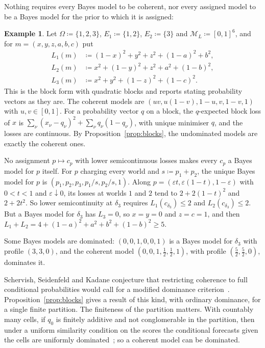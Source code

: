 \documentclass[11pt]{article}
\theoremstyle{definition}
\newtheorem{example}[theorem]{Example}
\theoremstyle{remark}
\newcommand{\M}{\mathcal M}
\begin{document}
Nothing requires every Bayes model to be coherent, nor every assigned model to be a Bayes model for the prior to which it is assigned:
\begin{example}\label{ex:conditional}
Let $\Omega\coloneqq\{1,2,3\}$, $E_1\coloneqq\{1,2\}$, $E_2\coloneqq\{3\}$ and $\M_L\coloneqq[0,1]^6$, and for $m=(x,y,z,a,b,c)$ put
\[
\begin{aligned}
L_1(m)&\coloneqq (1-x)^2+y^2+z^2+(1-a)^2+b^2,\\
L_2(m)&\coloneqq x^2+(1-y)^2+z^2+a^2+(1-b)^2,\\
L_3(m)&\coloneqq x^2+y^2+(1-z)^2+(1-c)^2.
\end{aligned}
\]
This is the block form with quadratic blocks and reports stating probability vectors as they are. The coherent models are $(uv,u(1-v),1-u,v,1-v,1)$ with $u,v\in[0,1]$. For a probability vector $q$ on a block, the $q$-expected block loss of $x$ is $\sum_\nu(x_\nu-q_\nu)^2+\sum_\nu q_\nu(1-q_\nu)$, with unique minimiser $q$, and the losses are continuous. By Proposition~\ref{prop:blocks}, the undominated models are exactly the coherent ones.

No assignment $p\mapsto c_p$ with lower semicontinuous losses makes every $c_p$ a Bayes model for $p$ itself. For $p$ charging every world and $s\coloneqq p_1+p_2$, the unique Bayes model for $p$ is $(p_1,p_2,p_3,p_1/s,p_2/s,1)$. Along $p=(\varepsilon t,\varepsilon(1-t),1-\varepsilon)$ with $0<t<1$ and $\varepsilon\downarrow0$, its losses at worlds $1$ and $2$ tend to $2+2(1-t)^2$ and $2+2t^2$. So lower semicontinuity at $\delta_3$ requires $L_1(c_{\delta_3})\le2$ and $L_2(c_{\delta_3})\le2$. But a Bayes model for $\delta_3$ has $L_3=0$, so $x=y=0$ and $z=c=1$, and then $L_1+L_2=4+(1-a)^2+a^2+b^2+(1-b)^2\ge5$.

Some Bayes models are dominated: $(0,0,1,0,0,1)$ is a Bayes model for $\delta_3$ with profile $(3,3,0)$, and the coherent model $(0,0,1,\frac12,\frac12,1)$, with profile $(\frac52,\frac52,0)$, dominates it.
\end{example}

Schervish, Seidenfeld and Kadane conjecture that restricting coherence to full conditional probabilities would call for a modified dominance criterion~\cite[Section~6]{SSK09}. Proposition~\ref{prop:blocks} gives a result of this kind, with ordinary dominance, for a single finite partition. The finiteness of the partition matters. With countably many cells, if $q_0$ is finitely additive and not conglomerable in the partition, then under a uniform similarity condition on the scores the conditional forecasts given the cells are uniformly dominated~\cite[Theorem~2]{SSK14}; so a coherent model can be dominated.
\end{document}
